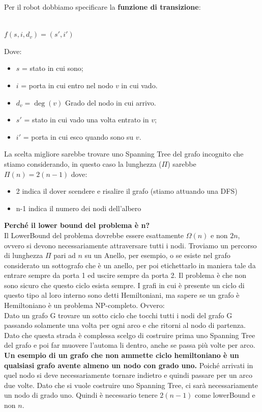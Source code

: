 Per il robot dobbiamo specificare la \textbf{funzione di transizione}:\\\\
\begin{center}
    $f(s,i,d_v) = (s',i')$
\end{center}

Dove:
\begin{itemize}
    \item $s$ = stato in cui sono;
    \item $i$ = porta in cui entro nel nodo $v$ in cui vado.
    \item $d_v = \deg(v)$ Grado del nodo in cui arrivo.
    \item $s'$ = stato in cui vado una volta entrato in $v$;
    \item $i'$ = porta in cui esco quando sono su $v$.
\end{itemize}

La scelta migliore sarebbe trovare uno Spanning Tree del grafo incognito che
stiamo considerando, in questo caso la lunghezza ($\Pi$) sarebbe $\Pi(n) =
    2(n-1)$ dove:
\begin{itemize}
    \item 2 indica il dover scendere e risalire il grafo (stiamo attuando una DFS)
    \item n-1 indica il numero dei nodi dell'albero
\end{itemize}
\textbf{Perché il lower bound del problema è n?}\\
Il LowerBound del problema dovrebbe essere esattamente $\Omega(n)$ e non $2n$,
ovvero si devono necessariamente attraversare tutti i nodi. Troviamo un percorso
di lunghezza $\Pi$ pari ad $n$ su un Anello, per esempio, o se esiste nel grafo
considerato un sottografo che è un anello, per poi etichettarlo in maniera tale
da entrare sempre da porta 1 ed uscire sempre da porta 2. Il problema è che non
sono sicuro che questo ciclo esista sempre. I grafi in cui è presente un ciclo
di questo tipo al loro interno sono detti Hemiltoniani, ma sapere se un grafo è
Hemiltoniano è un problema NP-completo. Ovvero:\\ Dato un grafo G trovare un
sotto ciclo che tocchi tutti i nodi del grafo G passando solamente una volta per
ogni arco e che ritorni al nodo di partenza.\\
Dato che questa strada è complessa scelgo di costruire prima uno Spanning Tree
del grafo e poi far muovere l'automa li dentro, anche se passa più volte per
arco. \\\textbf{Un esempio di un grafo che non ammette ciclo hemiltoniano è un
    qualsiasi grafo avente almeno un nodo con grado uno.} Poiché arrivati in quel
nodo si deve necessariamente tornare indietro e quindi passare per un arco due
volte. Dato che si vuole costruire uno Spanning Tree, ci sarà necessariamente un
nodo di grado uno. Quindi è necessario tenere $2(n-1)$ come lowerBound e non
$n$.

